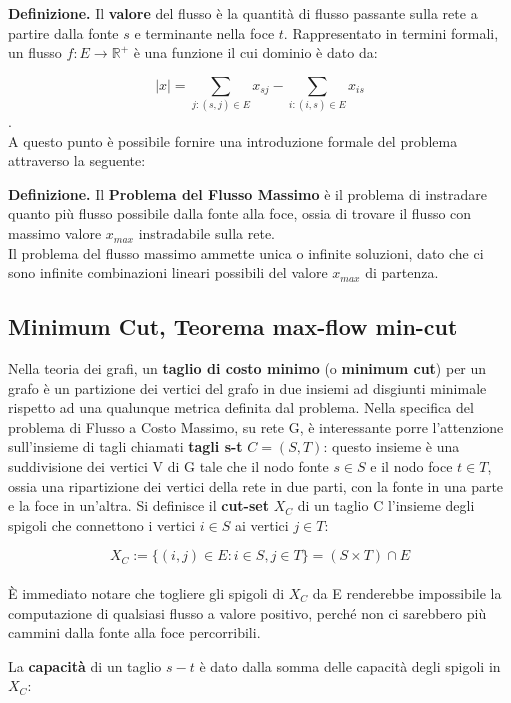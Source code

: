 \documentclass{article}
\begin{document}
\textbf{Definizione.} Il \textbf{valore} del flusso è la quantità di flusso passante sulla rete a partire dalla fonte $s$ e terminante nella foce $t$. Rappresentato in 
termini formali, un flusso $f : E \rightarrow \mathbb{R}^+$ è una funzione il cui dominio è dato da:

\[ \lvert x \rvert = \sum_{j: (s,j) \in E} x_{sj} - \sum_{i: (i,s) \in E} x_{is}\] .\\

A questo punto è possibile fornire una introduzione formale del problema attraverso la seguente:\\
\pagebreak

\textbf{Definizione.} Il \textbf{Problema del Flusso Massimo} è il problema di instradare quanto più flusso possibile dalla fonte alla foce, ossia di trovare il flusso 
con massimo valore $x_{max}$ instradabile sulla rete. \\

Il problema del flusso massimo ammette unica o infinite soluzioni, dato che ci sono infinite combinazioni lineari possibili del valore $x_{max}$ di partenza.


\subsection{Minimum Cut, Teorema max-flow min-cut}
Nella teoria dei grafi, un \textbf{taglio di costo minimo} (o \textbf{minimum cut}) per un grafo è un partizione dei vertici del grafo in due insiemi ad disgiunti minimale rispetto
ad una qualunque metrica definita dal problema. Nella specifica del problema di Flusso a Costo Massimo, su rete G, è interessante porre l'attenzione sull'insieme di tagli chiamati 
\textbf{tagli s-t} $C = (S,T)$: questo insieme è una suddivisione dei vertici V di G tale che il nodo fonte $s \in S$ e il nodo foce $t \in T$, ossia una ripartizione dei vertici
della rete in due parti, con la fonte in una parte e la foce in un'altra. 
Si definisce il \textbf{cut-set} $X_C$ di un taglio C l'insieme degli spigoli che connettono i vertici $i \in S$ ai vertici $j \in T$:

\[X_C := \{(i, j) \in E : i \in S, j \in T \} = (S \times T) \cap E\] \\

È immediato notare che togliere gli spigoli di $X_C$ da E renderebbe impossibile la computazione di qualsiasi flusso a valore positivo, perché non ci sarebbero più cammini dalla 
fonte alla foce percorribili.

La \textbf{capacità} di un taglio $s-t$ è dato dalla somma delle capacità degli spigoli in $X_C$:
\end{document}
